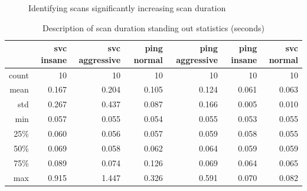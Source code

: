 \begin{figure}[!ht]
    \caption{Identifying scans significantly increasing scan duration}
    \label{fig:PingSvcInsAgrNormHist}%
\end{figure}

\begin{table}[htbp]
\caption{Description of scan duration standing out statistics (seconds)}
\begin{center}

\begin{tabular}{|r|r|r|r|r|r|r|}
\hline
&svc insane&svc aggressive&ping normal&ping aggressive&ping insane&svc normal\\
\hline
count&10&10&10&10&10&10\\
\hline
mean&0.167&0.204&0.105&0.124&0.061&0.063\\
\hline
std&0.267&0.437&0.087&0.166&0.005&0.010\\
\hline
min&0.057&0.055&0.054&0.055&0.053&0.055\\
\hline
25\%&0.060&0.056&0.057&0.059&0.058&0.055\\
\hline
50\%&0.069&0.058&0.062&0.064&0.059&0.059\\
\hline
75\%&0.089&0.074&0.126&0.069&0.064&0.065\\
\hline
max&0.915&1.447&0.326&0.591&0.070&0.082\\
\hline
\end{tabular}
\label{tbl:StandOutScanDuration}
\end{center}
\end{table}

